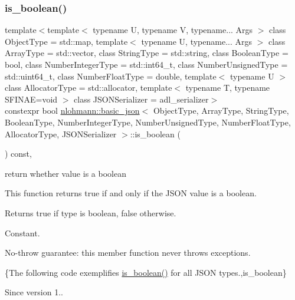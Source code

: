 \subsubsection{\texorpdfstring{is\+\_\+boolean()}{is\_boolean()}}
{\footnotesize\ttfamily template$<$template$<$ typename U, typename V, typename... Args $>$ class Object\+Type = std\+::map, template$<$ typename U, typename... Args $>$ class Array\+Type = std\+::vector, class String\+Type  = std\+::string, class Boolean\+Type  = bool, class Number\+Integer\+Type  = std\+::int64\+\_\+t, class Number\+Unsigned\+Type  = std\+::uint64\+\_\+t, class Number\+Float\+Type  = double, template$<$ typename U $>$ class Allocator\+Type = std\+::allocator, template$<$ typename T, typename S\+F\+I\+N\+A\+E=void $>$ class J\+S\+O\+N\+Serializer = adl\+\_\+serializer$>$ \\
constexpr bool \mbox{\hyperlink{classnlohmann_1_1basic__json}{nlohmann\+::basic\+\_\+json}}$<$ Object\+Type, Array\+Type, String\+Type, Boolean\+Type, Number\+Integer\+Type, Number\+Unsigned\+Type, Number\+Float\+Type, Allocator\+Type, J\+S\+O\+N\+Serializer $>$\+::is\+\_\+boolean (\begin{DoxyParamCaption}{ }\end{DoxyParamCaption}) const\hspace{0.3cm}{\ttfamily [inline]}, {\ttfamily [noexcept]}}



return whether value is a boolean 

This function returns true if and only if the J\+S\+ON value is a boolean.

\begin{DoxyReturn}{Returns}
{\ttfamily true} if type is boolean, {\ttfamily false} otherwise.
\end{DoxyReturn}
Constant.

No-\/throw guarantee\+: this member function never throws exceptions.

\{The following code exemplifies {\ttfamily \mbox{\hyperlink{classnlohmann_1_1basic__json_a943e8cb182d0f2365c76d64b42eaa6fd}{is\+\_\+boolean()}}} for all J\+S\+ON types.,is\+\_\+boolean\}

\begin{DoxySince}{Since}
version 1.. 
\end{DoxySince}
\mbox{\label{classnlohmann_1_1basic__json_aabe623bc8304c2ba92d96d91f390fab4}} 
